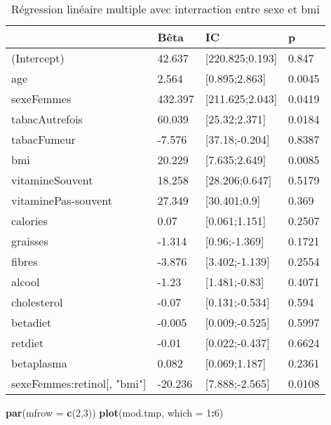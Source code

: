 \documentclass[]{article}
\newenvironment{Shaded}{\begin{snugshade}}{\end{snugshade}}
\newcommand{\KeywordTok}[1]{\textcolor[rgb]{0.13,0.29,0.53}{\textbf{#1}}}
\newcommand{\DataTypeTok}[1]{\textcolor[rgb]{0.13,0.29,0.53}{#1}}
\newcommand{\DecValTok}[1]{\textcolor[rgb]{0.00,0.00,0.81}{#1}}
\newcommand{\OperatorTok}[1]{\textcolor[rgb]{0.81,0.36,0.00}{\textbf{#1}}}
\newcommand{\NormalTok}[1]{#1}
\begin{document}
\begin{table}

\caption{\label{tab:unnamed-chunk-61}Régression linéaire multiple avec interraction entre sexe et bmi}
\centering
\begin{tabular}[t]{l|l|l|l}
\hline
  & Bêta & IC & p\\
\hline
\rowcolor[HTML]{BBD2E1}  (Intercept) & 42.637 & [220.825;0.193] & 0.847\\
\hline
age & 2.564 & [0.895;2.863] & 0.0045\\
\hline
\rowcolor[HTML]{BBD2E1}  sexeFemmes & 432.397 & [211.625;2.043] & 0.0419\\
\hline
tabacAutrefois & 60.039 & [25.32;2.371] & 0.0184\\
\hline
\rowcolor[HTML]{BBD2E1}  tabacFumeur & -7.576 & [37.18;-0.204] & 0.8387\\
\hline
bmi & 20.229 & [7.635;2.649] & 0.0085\\
\hline
\rowcolor[HTML]{BBD2E1}  vitamineSouvent & 18.258 & [28.206;0.647] & 0.5179\\
\hline
vitaminePas-souvent & 27.349 & [30.401;0.9] & 0.369\\
\hline
\rowcolor[HTML]{BBD2E1}  calories & 0.07 & [0.061;1.151] & 0.2507\\
\hline
graisses & -1.314 & [0.96;-1.369] & 0.1721\\
\hline
\rowcolor[HTML]{BBD2E1}  fibres & -3.876 & [3.402;-1.139] & 0.2554\\
\hline
alcool & -1.23 & [1.481;-0.83] & 0.4071\\
\hline
\rowcolor[HTML]{BBD2E1}  cholesterol & -0.07 & [0.131;-0.534] & 0.594\\
\hline
betadiet & -0.005 & [0.009;-0.525] & 0.5997\\
\hline
\rowcolor[HTML]{BBD2E1}  retdiet & -0.01 & [0.022;-0.437] & 0.6624\\
\hline
betaplasma & 0.082 & [0.069;1.187] & 0.2361\\
\hline
\rowcolor[HTML]{BBD2E1}  sexeFemmes:retinol[, "bmi"] & -20.236 & [7.888;-2.565] & 0.0108\\
\hline
\end{tabular}
\end{table}

\begin{Shaded}
\begin{Highlighting}[]
\KeywordTok{par}\NormalTok{(}\DataTypeTok{mfrow =} \KeywordTok{c}\NormalTok{(}\DecValTok{2}\NormalTok{,}\DecValTok{3}\NormalTok{))}
\KeywordTok{plot}\NormalTok{(mod.tmp, }\DataTypeTok{which =} \DecValTok{1}\OperatorTok{:}\DecValTok{6}\NormalTok{)}
\end{Highlighting}
\end{Shaded}
\end{document}
